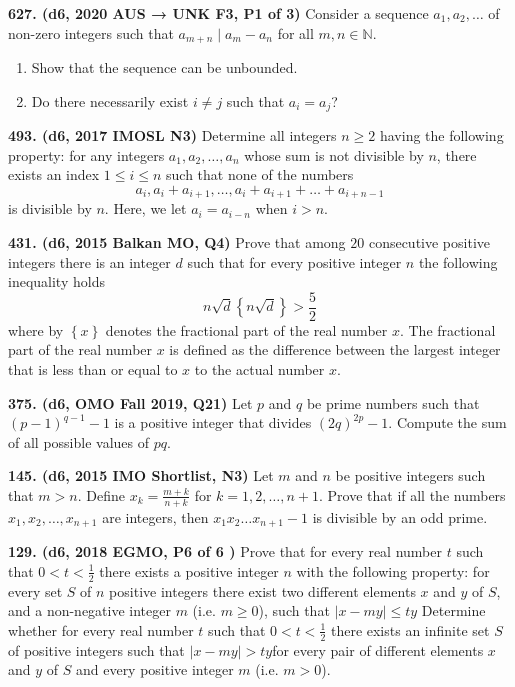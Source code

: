 \documentclass{article}
\begin{document}
\textbf{627. (\color{red}d6\color{black}, 2020 AUS → UNK F3, P1 of 3)} Consider a sequence $a_1, a_2, \dots $ of non-zero integers such that $a_{m + n} \mid a_{m} - a_{n}$ for all $m, n \in \mathbb{N}.$
\begin{enumerate}
    \item Show that the sequence can be unbounded.
    \item Do there necessarily exist $i \neq j$ such that $a_i = a_j$?
\end{enumerate}

\textbf{493. (\color{red}d6\color{black}, 2017 IMOSL N3)} Determine all integers $ n\geq 2$ having the following property: for any integers $a_1,a_2,\ldots, a_n$ whose sum is not divisible by $n$, there exists an index $1 \leq i \leq n$ such that none of the numbers $$a_i,a_i+a_{i+1},\ldots,a_i+a_{i+1}+\ldots+a_{i+n-1}$$is divisible by $n$. Here, we let $a_i=a_{i-n}$ when $i >n$.

\textbf{431. (\color{red}d6\color{black}, 2015 Balkan MO, Q4)} Prove that among $20$ consecutive positive integers there is an integer $d$ such that for every positive integer $n$ the following inequality holds
$$n \sqrt{d} \left\{n \sqrt {d} \right \} > \dfrac{5}{2}$$
where by $\left \{x \right \}$ denotes the fractional part of the real number $x$. The fractional part of the real number $x$ is defined as the difference between the largest integer that is less than or equal to $x$ to the actual number $x$.

\textbf{375. (\color{red}d6\color{black}, OMO Fall 2019, Q21)} Let $p$ and $q$ be prime numbers such that $(p-1)^{q-1}-1$ is a positive integer that divides $(2q)^{2p}-1$. Compute the sum of all possible values of $pq$.

\textbf{145. (\color{red}d6\color{black}, 2015 IMO Shortlist, N3)} Let $m$ and $n$ be positive integers such that $m>n$. Define $x_k=\frac{m+k}{n+k}$ for $k=1,2,\ldots,n+1$. Prove that if all the numbers $x_1,x_2,\ldots,x_{n+1}$ are integers, then $x_1x_2\ldots x_{n+1}-1$ is divisible by an odd prime.

\textbf{129. (\color{red}d6\color{black}, 2018 EGMO, P6 of 6     )} Prove that for every real number $t$ such that $0 < t < \tfrac{1}{2}$ there exists a positive integer $n$ with the following property: for every set $S$ of $n$ positive integers there exist two different elements $x$ and $y$ of $S$, and a non-negative integer $m$ (i.e. $m \ge 0 $), such that $ |x-my|\leq ty$ Determine whether for every real number $t$ such that $0 < t < \tfrac{1}{2} $ there exists an infinite set $S$ of positive integers such that $|x-my| > ty$for every pair of different elements $x$ and $y$ of $S$ and every positive integer $m$ (i.e. $m > 0$).
\end{document}

